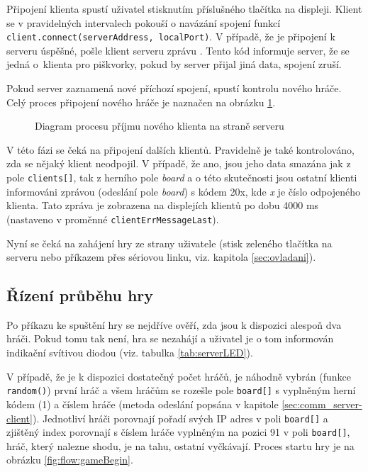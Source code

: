 Připojení klienta spustí uživatel stisknutím příslušného tlačítka na displeji. Klient se v pravidelných intervalech pokouší o navázání spojení funkcí \linebreak \mbox{\texttt{client.connect(serverAddress, localPort)}}. V případě, že je připojení k serveru úspěšné, pošle klient serveru zprávu . Tento kód informuje server, že se jedná o~klienta pro piškvorky, pokud by server přijal jiná data, spojení zruší.

Pokud server zaznamená nové příchozí spojení, spustí kontrolu nového hráče. Celý proces připojení nového hráče je naznačen na obrázku \ref{fig:flow:newClientServer}.

\begin{figure}
  \centering
  
  \caption{\label{fig:flow:newClientServer} Diagram procesu příjmu nového klienta na straně serveru}
\end{figure}

V této fázi se čeká na připojení dalších klientů. Pravidelně je také kontrolováno, zda se nějaký klient neodpojil. V případě, že ano, jsou jeho data smazána jak z pole \texttt{clients[]}, tak z herního pole \textit{board} a o této skutečnosti jsou ostatní klienti informováni zprávou (odeslání pole \textit{board}) s kódem 20x, kde \textit{x} je číslo odpojeného klienta. Tato zpráva je zobrazena na displejích klientů po dobu 4000 ms (nastaveno v proměnné \texttt{clientErrMessageLast}).

Nyní se čeká na zahájení hry ze strany uživatele (stisk zeleného tlačítka na serveru nebo příkazem přes sériovou linku, viz. kapitola \ref{sec:ovladani}).

\subsection{Řízení průběhu hry}
Po příkazu ke spuštění hry se nejdříve ověří, zda jsou k dispozici alespoň dva hráči. Pokud tomu tak není, hra se nezahájí a uživatel je o tom informován indikační svítivou diodou (viz. tabulka \ref{tab:serverLED}).

V případě, že je k dispozici dostatečný počet hráčů, je náhodně vybrán (funkce \texttt{random()}) první hráč a všem hráčům se rozešle pole \texttt{board[]} s vyplněným herní kódem (1) a číslem hráče (metoda odeslání popsána v kapitole \ref{sec:comm_server-client}). Jednotliví hráči porovnají pořadí svých IP adres v poli \texttt{board[]} a zjištěný index porovnají s číslem hráče vyplněným na pozici 91 v poli \texttt{board[]}, hráč, který nalezne shodu, je na tahu, ostatní vyčkávají. Proces startu hry je na obrázku \ref{fig:flow:gameBegin}.


